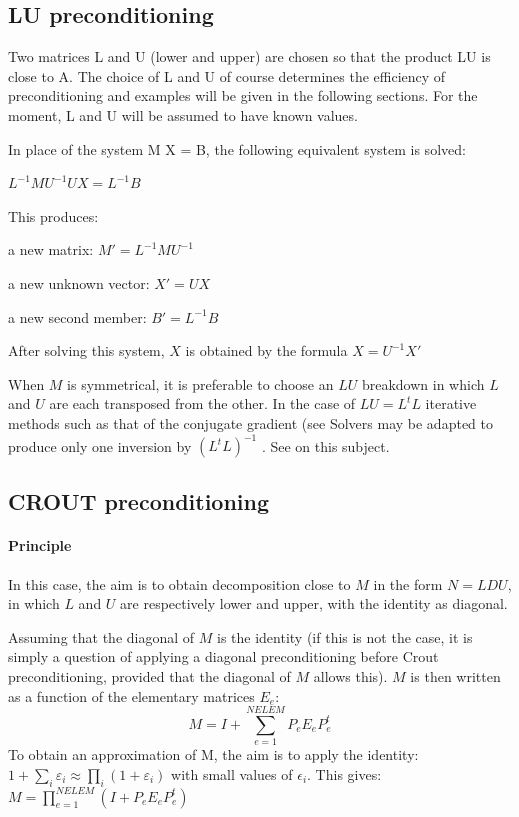 \subsection{LU preconditioning}

Two matrices L and U (lower and upper) are chosen so that the product LU is
close to A. The choice of L and U of course determines the efficiency of
preconditioning and examples will be given in the following sections. For the
moment, L and U will be assumed to have known values.

In place of the system M X = B, the following equivalent system is solved:

$L^{-1} M U^{-1} U X  =  L^{-1} B$



This produces:



a new matrix: $M' = L^{-1} M U^{-1}$

a new unknown vector: $X' = U X$

a new second member: $B' = L^{-1} B$



After solving this system, $X$ is obtained by the formula $X = U^{-1} X'$

When $M$ is symmetrical, it is preferable to choose an $LU$ breakdown in which
$L$ and $U$ are each transposed from the other. In the case of $LU = L^{t}L$
iterative methods such as that of the conjugate gradient (see
Solvers may be adapted to produce only one inversion by
$(L^{t}L)^{-1}$ . See \citet{Hervouet1991} on this subject.

\subsection{CROUT preconditioning}

\paragraph{Principle}

In this case, the aim is to obtain decomposition close to $M$ in the form $N
= LDU$, in which $L$ and $U$ are respectively lower and upper, with the
identity as diagonal.

Assuming that the diagonal of $M$ is the identity (if this is not the case, it is
simply a question of applying a diagonal preconditioning before Crout
preconditioning, provided that the diagonal of $M$ allows this). $M$ is then
written as a function of the elementary matrices $E_{e}$:
\[M=I+\sum _{e=1}^{NELEM}P_{e} E_{e} P_{e}^{t}  \]
To obtain an approximation of M, the aim is to apply the identity:
$1+\sum _{i}\varepsilon _{i}  \approx \prod _{i}(1+\varepsilon _{i} ) $ with
small values of $\epsilon _{i}$. This gives: $M=\prod _{e=1}^{NELEM}(I+P_{e} E_{e} P_{e}^{t}
) $

